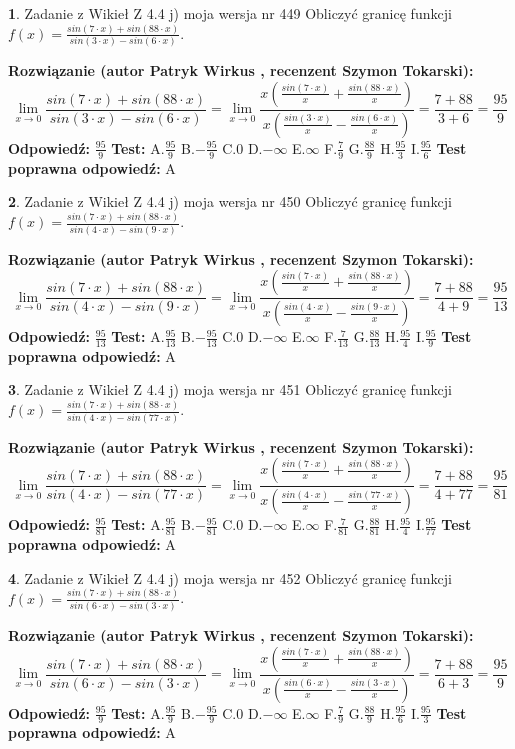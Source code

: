 \documentclass[12pt, a4paper]{article}
\theoremstyle{definition} %
\newtheorem{zad}{}
\newcommand{\zadStart}[1]{\begin{zad}#1\newline}
\newcommand{\zadStop}{\end{zad}}
\newcommand{\rozwStart}[2]{\noindent \textbf{Rozwiązanie (autor #1 , recenzent #2): }\newline}
\newcommand{\rozwStop}{\newline}
\newcommand{\odpStart}{\noindent \textbf{Odpowiedź:}\newline}
\newcommand{\odpStop}{\newline}
\newcommand{\testStart}{\noindent \textbf{Test:}\newline}
\newcommand{\testStop}{\newline}
\newcommand{\kluczStart}{\noindent \textbf{Test poprawna odpowiedź:}\newline}
\newcommand{\kluczStop}{\newline}
\begin{document}
\zadStart{Zadanie z Wikieł Z 4.4 j) moja wersja nr 449}
Obliczyć granicę funkcji $f(x)=\frac{sin(7\cdot x) +sin(88\cdot x)}{sin(3\cdot x) -sin(6\cdot x)}$.
\zadStop
\rozwStart{Patryk Wirkus}{Szymon Tokarski}
$$\lim\limits_{x\to 0}\frac{sin(7\cdot x) +sin(88\cdot x)}{sin(3\cdot x) -sin(6\cdot x)}=\lim\limits_{x\to 0}\frac{x(\frac{sin(7\cdot x)}{x}+\frac{sin(88\cdot x)}{x})}{x(\frac{sin(3\cdot x)}{x}-\frac{sin(6\cdot x)}{x})}=\frac{7+88}{3+6} = \frac{95}{9}$$
\rozwStop
\odpStart
$\frac{95}{9}$
\odpStop
\testStart
A.$\frac{95}{9}$
B.$-\frac{95}{9}$
C.$0$
D.$-\infty$
E.$\infty$
F.$\frac{7}{9}$
G.$\frac{88}{9}$
H.$\frac{95}{3}$
I.$\frac{95}{6}$
\testStop
\kluczStart
A
\kluczStop



\zadStart{Zadanie z Wikieł Z 4.4 j) moja wersja nr 450}
Obliczyć granicę funkcji $f(x)=\frac{sin(7\cdot x) +sin(88\cdot x)}{sin(4\cdot x) -sin(9\cdot x)}$.
\zadStop
\rozwStart{Patryk Wirkus}{Szymon Tokarski}
$$\lim\limits_{x\to 0}\frac{sin(7\cdot x) +sin(88\cdot x)}{sin(4\cdot x) -sin(9\cdot x)}=\lim\limits_{x\to 0}\frac{x(\frac{sin(7\cdot x)}{x}+\frac{sin(88\cdot x)}{x})}{x(\frac{sin(4\cdot x)}{x}-\frac{sin(9\cdot x)}{x})}=\frac{7+88}{4+9} = \frac{95}{13}$$
\rozwStop
\odpStart
$\frac{95}{13}$
\odpStop
\testStart
A.$\frac{95}{13}$
B.$-\frac{95}{13}$
C.$0$
D.$-\infty$
E.$\infty$
F.$\frac{7}{13}$
G.$\frac{88}{13}$
H.$\frac{95}{4}$
I.$\frac{95}{9}$
\testStop
\kluczStart
A
\kluczStop



\zadStart{Zadanie z Wikieł Z 4.4 j) moja wersja nr 451}
Obliczyć granicę funkcji $f(x)=\frac{sin(7\cdot x) +sin(88\cdot x)}{sin(4\cdot x) -sin(77\cdot x)}$.
\zadStop
\rozwStart{Patryk Wirkus}{Szymon Tokarski}
$$\lim\limits_{x\to 0}\frac{sin(7\cdot x) +sin(88\cdot x)}{sin(4\cdot x) -sin(77\cdot x)}=\lim\limits_{x\to 0}\frac{x(\frac{sin(7\cdot x)}{x}+\frac{sin(88\cdot x)}{x})}{x(\frac{sin(4\cdot x)}{x}-\frac{sin(77\cdot x)}{x})}=\frac{7+88}{4+77} = \frac{95}{81}$$
\rozwStop
\odpStart
$\frac{95}{81}$
\odpStop
\testStart
A.$\frac{95}{81}$
B.$-\frac{95}{81}$
C.$0$
D.$-\infty$
E.$\infty$
F.$\frac{7}{81}$
G.$\frac{88}{81}$
H.$\frac{95}{4}$
I.$\frac{95}{77}$
\testStop
\kluczStart
A
\kluczStop



\zadStart{Zadanie z Wikieł Z 4.4 j) moja wersja nr 452}
Obliczyć granicę funkcji $f(x)=\frac{sin(7\cdot x) +sin(88\cdot x)}{sin(6\cdot x) -sin(3\cdot x)}$.
\zadStop
\rozwStart{Patryk Wirkus}{Szymon Tokarski}
$$\lim\limits_{x\to 0}\frac{sin(7\cdot x) +sin(88\cdot x)}{sin(6\cdot x) -sin(3\cdot x)}=\lim\limits_{x\to 0}\frac{x(\frac{sin(7\cdot x)}{x}+\frac{sin(88\cdot x)}{x})}{x(\frac{sin(6\cdot x)}{x}-\frac{sin(3\cdot x)}{x})}=\frac{7+88}{6+3} = \frac{95}{9}$$
\rozwStop
\odpStart
$\frac{95}{9}$
\odpStop
\testStart
A.$\frac{95}{9}$
B.$-\frac{95}{9}$
C.$0$
D.$-\infty$
E.$\infty$
F.$\frac{7}{9}$
G.$\frac{88}{9}$
H.$\frac{95}{6}$
I.$\frac{95}{3}$
\testStop
\kluczStart
A
\kluczStop
\end{document}
